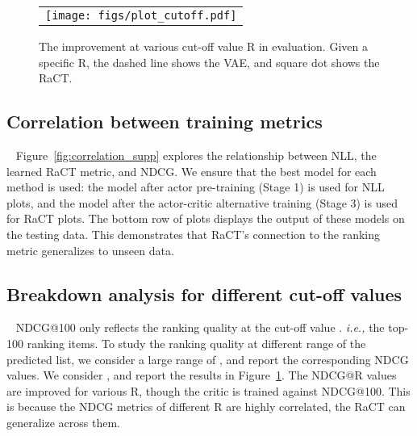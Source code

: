 \documentclass{article} \usepackage{iclr2020_conference,times}
\newcommand{\ie}[0]{\emph{i.e., }}
\begin{document}
\begin{figure}[t!] \centering
	\vspace{-0mm}
	\begin{tabular}{c}
	    \hspace{-0mm}
		\texttt{[image: figs/plot\_cutoff.pdf]} \\
	\end{tabular}
	\vspace{-0mm}
	\caption{The improvement at various cut-off value R in evaluation. Given a specific R, the dashed line shows the VAE, and square dot shows the RaCT.}
	\vspace{-0mm}
	\label{fig:cut_off}
\end{figure}

\subsection{Correlation between training metrics}~\label{sec_training_metrics}
Figure~\ref{fig:correlation_supp} explores the relationship between NLL, the learned RaCT metric, and NDCG. We ensure that the best model for each method is used: the model after actor pre-training (Stage 1) is used for NLL plots, and the model after the actor-critic alternative training (Stage 3) is used for RaCT plots. The bottom row of plots displays the output of these models on the testing data. This demonstrates that RaCT's connection to the ranking metric generalizes to unseen data.


\subsection{Breakdown analysis for different cut-off values}~\label{sec_cut_off_supp} 
NDCG@100 only reflects the ranking quality at the cut-off value . \ie the top-100 ranking items. To study the ranking quality at different range of the predicted list, we consider a large range of , and report the corresponding NDCG values. We consider , and report the results in Figure~\ref{fig:cut_off}. The NDCG@R values are improved for various R, though the critic is trained against NDCG@100. This is because the NDCG metrics of different R are highly correlated, the RaCT can generalize across them.
\end{document}
